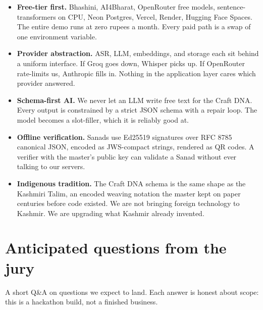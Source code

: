 \documentclass[11pt,a4paper]{article}
\begin{document}
\begin{itemize}[leftmargin=*]
  \item \textbf{Free-tier first.} Bhashini, AI4Bharat, OpenRouter free
        models, sentence-transformers on CPU, Neon Postgres, Vercel,
        Render, Hugging Face Spaces. The entire demo runs at zero
        rupees a month. Every paid path is a swap of one environment
        variable.
  \item \textbf{Provider abstraction.} ASR, LLM, embeddings, and storage
        each sit behind a uniform interface. If Groq goes down, Whisper
        picks up. If OpenRouter rate-limits us, Anthropic fills in.
        Nothing in the application layer cares which provider answered.
  \item \textbf{Schema-first AI.} We never let an LLM write free text
        for the Craft DNA. Every output is constrained by a strict
        JSON schema with a repair loop. The model becomes a slot-filler,
        which it is reliably good at.
  \item \textbf{Offline verification.} Sanads use Ed25519 signatures
        over RFC 8785 canonical JSON, encoded as JWS-compact strings,
        rendered as QR codes. A verifier with the master's public key
        can validate a Sanad without ever talking to our servers.
  \item \textbf{Indigenous tradition.} The Craft DNA schema is the
        same shape as the Kashmiri Talim, an encoded weaving notation
        the master kept on paper centuries before code existed. We are
        not bringing foreign technology to Kashmir. We are upgrading
        what Kashmir already invented.
\end{itemize}

\section{Anticipated questions from the jury}

A short Q\&A on questions we expect to land. Each answer is honest
about scope: this is a hackathon build, not a finished business.
\end{document}
